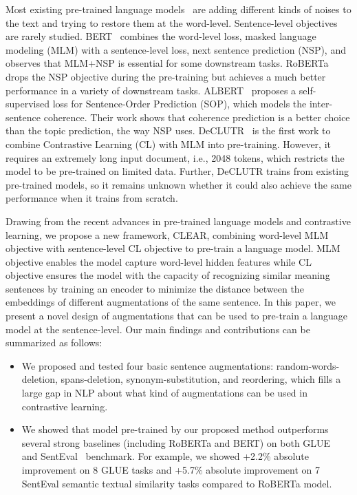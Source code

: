 \documentclass[11pt,a4paper]{article}
\begin{document}
Most existing pre-trained language models~\cite{devlin2019bert, liu2019roberta, lewis2019bart} are adding different kinds of noises to the text and trying to restore them at the word-level. 
Sentence-level objectives are rarely studied. BERT~\cite{devlin2019bert} combines the word-level loss, masked language modeling (MLM) with a sentence-level loss, next sentence prediction (NSP), and observes that MLM+NSP is essential for some downstream tasks. RoBERTa~\cite{liu2019roberta} drops the NSP objective during the pre-training but achieves a much better performance in a variety of downstream tasks. 
ALBERT~\cite{lan2019albert} proposes a self-supervised loss for Sentence-Order Prediction (SOP), which models the inter-sentence coherence. Their work shows that coherence prediction is a better choice than the topic prediction, the way NSP uses. 
DeCLUTR~\cite{giorgi2020declutr} is the first work to combine Contrastive Learning (CL) with MLM into pre-training. However, it requires an extremely long input document, i.e., 2048 tokens, which restricts the model to be pre-trained on limited data. Further, DeCLUTR trains from existing pre-trained models, so it remains unknown whether it could also achieve the same performance when it trains from scratch.

Drawing from the recent advances in pre-trained language models and contrastive learning, we propose a new framework, CLEAR, combining word-level MLM objective with sentence-level CL objective to pre-train a language model. MLM objective enables the model capture word-level hidden features while CL objective ensures the model with the capacity of recognizing similar meaning sentences by training an encoder to minimize the distance between the embeddings of different augmentations of the same sentence. In this paper, we present a novel design of augmentations that can be used to pre-train a language model at the sentence-level. Our main findings and contributions can be summarized as follows:

\begin{itemize}
    \item
    We proposed and tested four basic sentence augmentations: random-words-deletion, spans-deletion, synonym-substitution,  and reordering, which fills a large gap in NLP about what kind of augmentations can be used in contrastive learning.
    \item
    We showed that model pre-trained by our proposed method outperforms several strong baselines (including RoBERTa and BERT) on both GLUE~\cite{wang2018glue} and SentEval~\cite{conneau2018senteval} benchmark. For example, we showed +2.2\% absolute improvement on 8 GLUE tasks and +5.7\% absolute improvement on 7 SentEval semantic textual similarity tasks compared to RoBERTa model.
\end{itemize}
\end{document}
